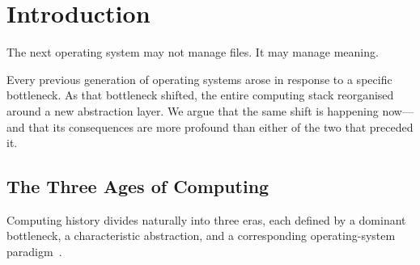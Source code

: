 \section{Introduction}\label{sec:introduction}

The next operating system may not manage files.  It may manage meaning.

Every previous generation of operating systems arose in response to a
specific bottleneck.  As that bottleneck shifted, the entire computing
stack reorganised around a new abstraction layer.  We argue that the
same shift is happening now---and that its consequences are more
profound than either of the two that preceded it.

\subsection{The Three Ages of Computing}\label{sec:three-ages}

Computing history divides naturally into three eras, each defined by a
dominant bottleneck, a characteristic abstraction, and a corresponding
operating-system paradigm~\cite{silberschatz2018operating}.

